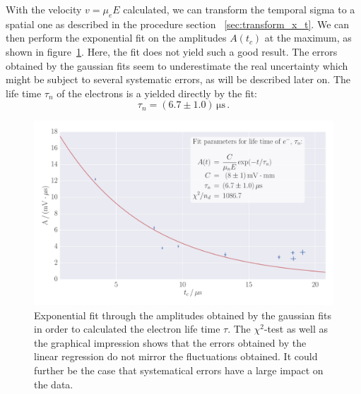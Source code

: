 With the velocity $v = \mu_e E$ calculated, we can transform 
the temporal sigma to a spatial one as described in the procedure section~%
\ref{sec:transform_x_t}. We can then perform the exponential fit on 
the amplitudes $A(t_c)$ at the maximum, as shown in figure~\ref{fig:h_s_tau_d}.
Here, the fit does not yield such a good result. The errors obtained 
by the gaussian fits seem to underestimate the real uncertainty 
which might be subject to several systematic errors, as will be described later on. 
The life time $\tau_n$ of the electrons is a yielded directly by the fit:
\begin{equation}
    \tau_n = (6.7 \pm 1.0)\, \mathrm{\mu s} \, .
\end{equation}
\begin{figure}
    \includegraphics[width=1.0\textwidth]{figures/haynes_shockley_tau_d}
    \caption{
        Exponential fit through the amplitudes obtained by the gaussian fits 
        in order to calculated the electron life time $\tau$. The $\chi^2$-test 
        as well as the graphical impression shows that the errors obtained by the 
        linear regression do not mirror the fluctuations obtained. It could 
        further be the case that systematical errors have a large impact on the 
        data. 
        }
    \label{fig:h_s_tau_d}
\end{figure}

